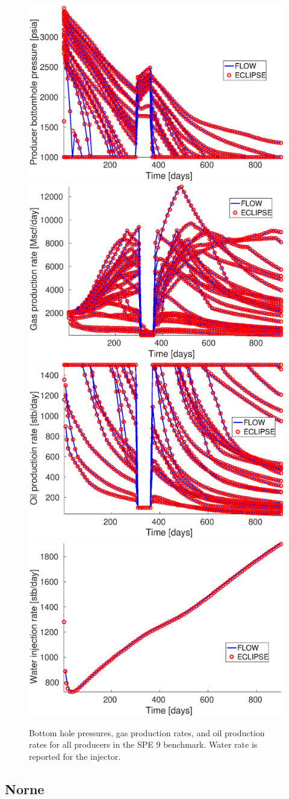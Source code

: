 \begin{figure}
  \includegraphics[width=.49\textwidth]{figures/spe9/spe9_wbhp_prod} \hfill
  \includegraphics[width=.49\textwidth]{figures/spe9/spe9_wgpr}\\
  \includegraphics[width=.49\textwidth]{figures/spe9/spe9_wopr}\hfill
  \includegraphics[width=.49\textwidth]{figures/spe9/spe9_wwir}
  \caption{Bottom hole pressures, gas production rates, and oil production rates for all
    producers in the SPE 9 benchmark. Water rate {\revised is reported} for the injector.}
  \label{fig:spe9_results}
\end{figure}


\subsection{Norne}
\label{sec:norne}

